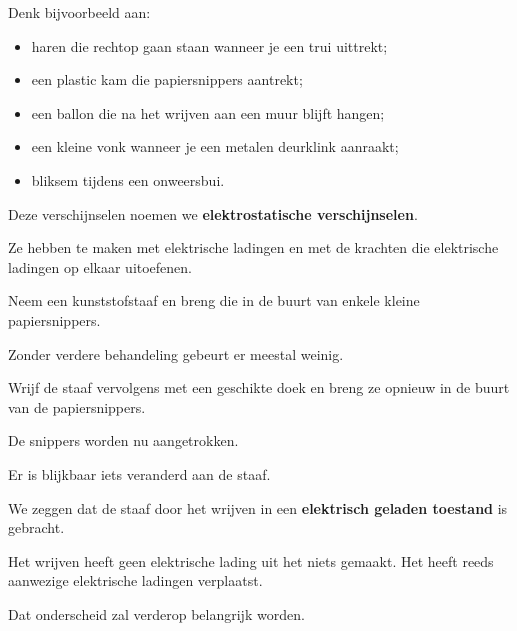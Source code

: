 \documentclass{ximera}
\begin{document}
Denk bijvoorbeeld aan:

\begin{itemize}
  \item haren die rechtop gaan staan wanneer je een trui uittrekt;
  \item een plastic kam die papiersnippers aantrekt;
  \item een ballon die na het wrijven aan een muur blijft hangen;
  \item een kleine vonk wanneer je een metalen deurklink aanraakt;
  \item bliksem tijdens een onweersbui.
\end{itemize}

Deze verschijnselen noemen we \textbf{elektrostatische verschijnselen}.

Ze hebben te maken met elektrische ladingen en met de krachten die
elektrische ladingen op elkaar uitoefenen.




Neem een kunststofstaaf en breng die in de buurt van enkele kleine
papiersnippers.

Zonder verdere behandeling gebeurt er meestal weinig.

Wrijf de staaf vervolgens met een geschikte doek en breng ze opnieuw
in de buurt van de papiersnippers.

De snippers worden nu aangetrokken.

Er is blijkbaar iets veranderd aan de staaf.


\begin{opmerking}

We zeggen dat de staaf door het wrijven in een
\textbf{elektrisch geladen toestand} is gebracht.

Het wrijven heeft geen elektrische lading uit het niets gemaakt.
Het heeft reeds aanwezige elektrische ladingen verplaatst.

\end{opmerking}


Dat onderscheid zal verderop belangrijk worden.



\end{document}
